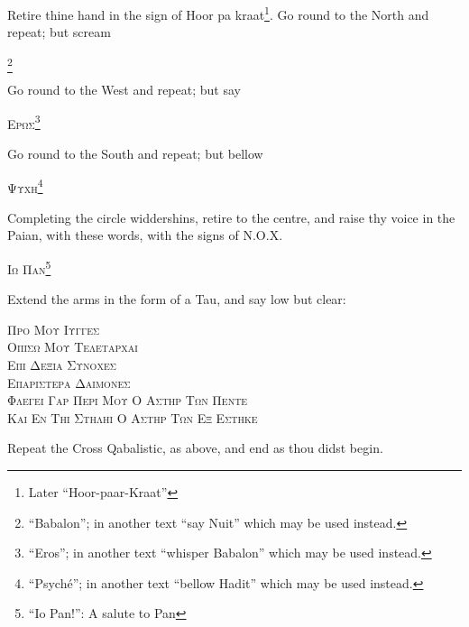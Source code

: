 Retire thine hand in the sign of Hoor pa kraat\footnote{Later \enquote{Hoor-paar-Kraat}}. Go round to the North and repeat; but scream \begin{quoting}[indentfirst=false]\textgreek{\textsc{\GreekBabalon}}\footnote{\enquote{Babalon}; in another text \enquote{say Nuit} which may be used instead.} \end{quoting}

Go round to the West and repeat; but say \begin{quoting}[indentfirst=false]\textgreek{\textsc{Ερωσ}}\footnote{\enquote{Eros}; in another text \enquote{whisper Babalon} which may be used instead.} \end{quoting}

Go round to the South and repeat; but bellow \begin{quoting}[indentfirst=false]\textgreek{\textsc{Ψυχη}}\footnote{\enquote{Psych\'e}; in another text \enquote{bellow Hadit} which may be used instead.} \end{quoting}

Completing the circle widdershins, retire to the centre, and raise thy voice in the Paian, with these words, with the signs of N.O.X. \begin{quoting}[indentfirst=false]\textgreek{\textsc{Ιω Παν}}\footnote{\enquote{Io Pan!}: A salute to Pan}\end{quoting}

Extend the arms in the form of a Tau, and say low but clear:

\begin{quoting}[indentfirst=false]
\textgreek{\textsc{Προ Μου Ιυγγεσ}} \\
\textgreek{\textsc{Οπισω Μου Τελεταρχαι}} \\
\textgreek{\textsc{Επι Δεξια Συνοχεσ}} \\
\textgreek{\textsc{Επαριστερα Δαιμονεσ}} \\
\textgreek{\textsc{Φλεγει Γαρ Περι Μου Ο Αστηρ Των Πεντε}} \\
\textgreek{\textsc{Και Εν Τηι Στηληι Ο Αστηρ Των Εξ Εστηκε}}\footnotemark
\end{quoting}Repeat the Cross Qabalistic, as above, and end as thou didst begin.
